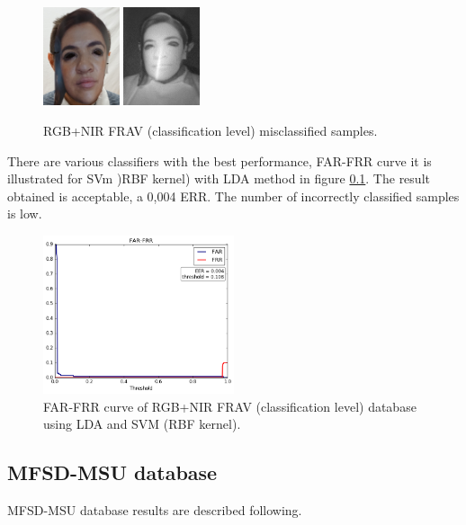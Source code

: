 \begin{figure}[htb]
\centering
\includegraphics[width=0.2\textwidth]{images_databases/frav_rgb_128.JPG}
\includegraphics[width=0.2\textwidth]{images_databases/frav_nir_128.jpg}
\caption{RGB+NIR FRAV (classification level) misclassified samples.} \label{fig:frav_clas_miscl}
\end{figure}

There are various classifiers with the best performance, FAR-FRR curve it is illustrated for SVm )RBF kernel) with LDA method in figure \ref{}. The result obtained is acceptable, a 0,004 ERR. The number of incorrectly classified samples is low.

\begin{figure}[htb]
\centering
\includegraphics[width=0.5\textwidth]{images/FAR-FRR/FRAV_clas_LDA_SVM_RBF_FAR_FRR.png}
\caption{FAR-FRR curve of RGB+NIR FRAV (classification level) database using LDA and SVM (RBF kernel).} \label{fig:RGB_FRAV_clas_FAR_FRR}
\end{figure}

\subsection{MFSD-MSU database}
MFSD-MSU database results are described following.\\

